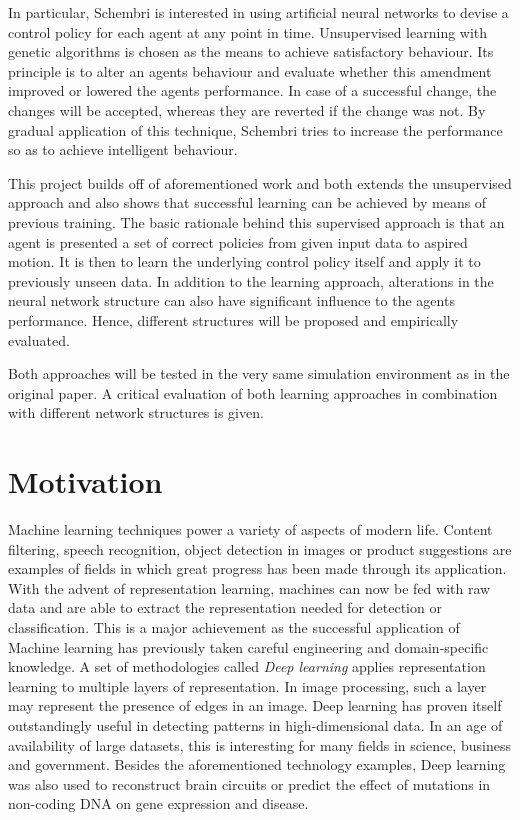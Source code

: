 \documentclass[10pt,a4paper,DIV=11]{scrreprt}
\begin{document}
In particular, Schembri is interested in using artificial neural networks to devise a control policy for each agent at any point in time. 
Unsupervised learning with genetic algorithms is chosen as the means to achieve satisfactory behaviour. Its principle is to alter 
an agents behaviour and evaluate whether this amendment improved or lowered the agents performance. In case of a successful change, the changes
will be accepted, whereas they are reverted if the change was not. By gradual application of this technique, Schembri tries to increase
the performance so as to achieve intelligent behaviour.


This project builds off of aforementioned work and both extends the unsupervised approach and also shows that successful learning can be 
achieved by means of previous training. The basic rationale behind this supervised approach is that an agent is presented a set of correct 
policies from given input data to aspired motion. It is then to learn the underlying control policy itself and apply it to
previously unseen data. In addition to the learning approach, alterations in the neural network structure can also have significant influence
to the agents performance. Hence, different structures will be proposed and empirically evaluated.


Both approaches will be tested in the very same simulation environment as in the original paper. A critical evaluation of both learning approaches
in combination with different network structures is given.

\section{Motivation}
Machine learning techniques power a variety of aspects of modern life. Content filtering, speech recognition, object detection in
images or product suggestions are examples of fields in which great progress has been made through its application. 
With the advent of representation learning, machines can now be fed with raw data and are able to extract the representation needed for detection
or classification. This is a major achievement as the successful application of Machine learning has previously taken careful engineering and
domain-specific knowledge. A set of methodologies called \textit{Deep learning} applies representation learning to multiple layers of representation. 
In image processing, such a layer may represent the presence of edges in an image. Deep learning has proven itself outstandingly useful in detecting 
patterns in high-dimensional data. In an age of availability of large datasets, this is interesting for many fields in science, business and government.
Besides the aforementioned technology examples, Deep learning was also used to reconstruct brain circuits or predict the effect of mutations in
non-coding DNA on gene expression and disease.\cite{DEEPLEARNING}
\end{document}
